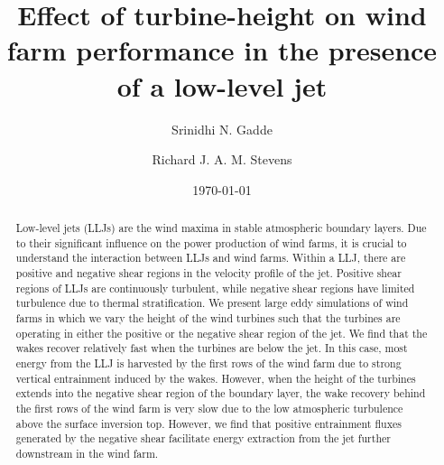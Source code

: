\documentclass[%
 aip,
 amsmath,amssymb,
preprint,%
author-numerical,%
]{revtex4-1}
\begin{document}

\title[LLJ \& shear]{Effect of turbine-height on wind farm performance in the presence of a low-level jet}

\author{Srinidhi N. Gadde}
\author{Richard J. A. M. Stevens}%

\date{\today}%

\begin{abstract}
Low-level jets (LLJs) are the wind maxima in stable atmospheric boundary layers. Due to their significant influence on the power production of wind farms, it is crucial to understand the interaction between LLJs and wind farms. Within a LLJ, there are positive and negative shear regions in the velocity profile of the jet. Positive shear regions of LLJs are continuously turbulent, while negative shear regions have limited turbulence due to thermal stratification. We present large eddy simulations of wind farms in which we vary the height of the wind turbines such that the turbines are operating in either the positive or the negative shear region of the jet. We find that the wakes recover relatively fast when the turbines are below the jet. In this case, most energy from the LLJ is harvested by the first rows of the wind farm due to strong vertical entrainment induced by the wakes. However, when the height of the turbines extends into the negative shear region of the boundary layer, the wake recovery behind the first rows of the wind farm is very slow due to the low atmospheric turbulence above the surface inversion top. However, we find that positive entrainment fluxes generated by the negative shear facilitate energy extraction from the jet further downstream in the wind farm.
\end{abstract}

\maketitle
\end{document}
